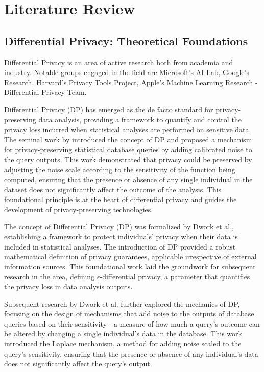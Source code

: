 \chapter{Literature Review\label{chap:lit-review}}

\section{Differential Privacy: Theoretical Foundations}
Differential Privacy is an area of active research both from academia and industry. Notable groups engaged in the field are Microsoft's AI Lab, Google's Research, Harvard's Privacy Tools Project, Apple's Machine Learning Research - Differential Privacy Team. 

Differential Privacy (DP) has emerged as the de facto standard for privacy-preserving data analysis, providing a framework to quantify and control the privacy loss incurred when statistical analyses are performed on sensitive data. The seminal work by \citep{Dwork2006} introduced the concept of DP and proposed a mechanism for privacy-preserving statistical database queries by adding calibrated noise to the query outputs. This work demonstrated that privacy could be preserved by adjusting the noise scale according to the sensitivity of the function being computed, ensuring that the presence or absence of any single individual in the dataset does not significantly affect the outcome of the analysis. This foundational principle is at the heart of differential privacy and guides the development of privacy-preserving technologies.

The concept of Differential Privacy (DP) was formalized by Dwork et al., establishing a framework to protect individuals' privacy when their data is included in statistical analyses. The introduction of DP provided a robust mathematical definition of privacy guarantees, applicable irrespective of external information sources\cite{Dwork2006}. This foundational work laid the groundwork for subsequent research in the area, defining $\epsilon$-differential privacy, a parameter that quantifies the privacy loss in data analysis outputs.

Subsequent research by Dwork et al. further explored the mechanics of DP, focusing on the design of mechanisms that add noise to the outputs of database queries based on their sensitivity—a measure of how much a query's outcome can be altered by changing a single individual's data in the database\cite{Dwork2006}. This work introduced the Laplace mechanism, a method for adding noise scaled to the query's sensitivity, ensuring that the presence or absence of any individual's data does not significantly affect the query's output.

